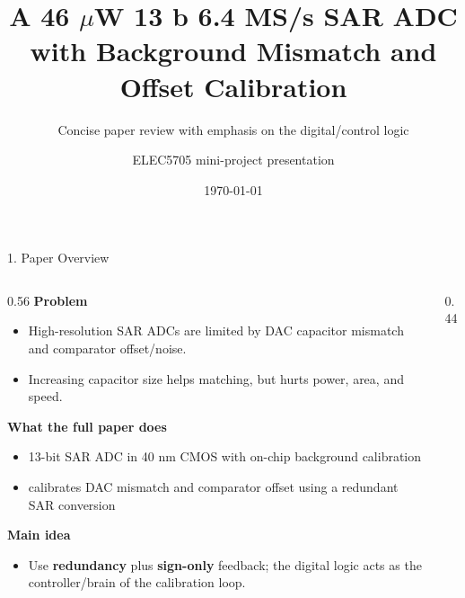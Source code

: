 \documentclass[aspectratio=169]{beamer}
\title[46 $\mu$W 13 b SAR ADC calibration]{A 46 $\mu$W 13 b 6.4 MS/s SAR ADC\\with Background Mismatch and Offset Calibration}
\subtitle[7-slide review]{Concise paper review with emphasis on the digital/control logic}
\author[ELEC5705 mini-project]{ELEC5705 mini-project presentation}
\date{\today}
\begin{document}
\begin{frame}
  \titlepage
\end{frame}

\begin{frame}{1. Paper Overview}
  \begin{columns}[T]
    \begin{column}{0.56\textwidth}
      \small
      \textbf{Problem}
      \begin{itemize}
        \item High-resolution SAR ADCs are limited by DAC capacitor mismatch and comparator offset/noise.
        \item Increasing capacitor size helps matching, but hurts power, area, and speed.
      \end{itemize}

      \textbf{What the full paper does}
      \begin{itemize}
        \item 13-bit SAR ADC in 40 nm CMOS with on-chip background calibration
        \item calibrates DAC mismatch and comparator offset using a redundant SAR conversion
      \end{itemize}

      \textbf{Main idea}
      \begin{itemize}
        \item Use \textbf{redundancy} plus \textbf{sign-only} feedback; the digital logic acts as the controller/brain of the calibration loop.
      \end{itemize}
    \end{column}
    \begin{column}{0.44\textwidth}
      \centering
    \end{column}
  \end{columns}
\end{frame}
\end{document}
